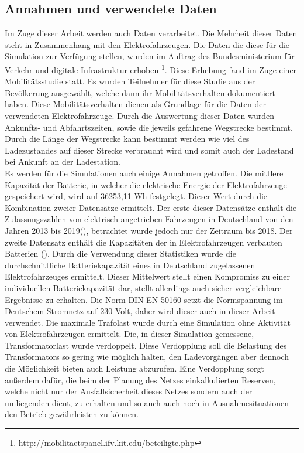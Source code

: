 \subsection{Annahmen und verwendete Daten}
Im Zuge dieser Arbeit werden auch Daten verarbeitet. Die Mehrheit dieser Daten steht in Zusammenhang mit den Elektrofahrzeugen. Die Daten die diese für die Simulation zur Verfügung stellen, wurden im Auftrag des Bundesministerium für Verkehr und digitale Infrastruktur erhoben \footnote{http://mobilitaetspanel.ifv.kit.edu/beteiligte.php}. Diese Erhebung fand im Zuge einer Mobilitätsstudie statt. Es wurden Teilnehmer für diese Studie aus der Bevölkerung ausgewählt, welche dann ihr Mobilitätsverhalten dokumentiert haben. Diese Mobilitätsverhalten dienen als Grundlage für die Daten der verwendeten Elektrofahrzeuge. Durch die Auswertung dieser Daten wurden Ankunfts- und Abfahrtszeiten, sowie die jeweils gefahrene Wegstrecke bestimmt. Durch die Länge der Wegstrecke kann bestimmt werden wie viel des Ladezustandes auf dieser Strecke verbraucht wird und somit auch der Ladestand bei Ankunft an der Ladestation.\\
Es werden für die Simulationen auch einige Annahmen getroffen. Die mittlere Kapazität der Batterie, in welcher die elektrische Energie der Elektrofahrzeuge gespeichert wird, wird auf 36253,11 Wh festgelegt. Dieser Wert durch die Kombination zweier Datensätze ermittelt. Der erste dieser Datensätze enthält die Zulassungszahlen von elektrisch angetrieben Fahrzeugen in Deutschland von den Jahren 2013 bis 2019(\cite{ahlswede_2020}), betrachtet wurde jedoch nur der Zeitraum bis 2018. Der zweite Datensatz enthält die Kapazitäten der in Elektrofahrzeugen verbauten Batterien (\cite{akkuStat}). Durch die Verwendung dieser Statistiken wurde die durchschnittliche Batteriekapazität eines in Deutschland zugelassenen Elektrofahrzeuges ermittelt. Dieser Mittelwert stellt einen Kompromiss zu einer individuellen Batteriekapazität dar, stellt allerdings auch sicher vergleichbare Ergebnisse zu erhalten. Die Norm DIN EN 50160 setzt die Normspannung im Deutschem Stromnetz auf 230 Volt, daher wird dieser auch in dieser Arbeit verwendet. Die maximale Trafolast wurde durch eine Simulation ohne Aktivität von Elektrofahrzeugen ermittelt. Die, in dieser Simulation gemessene, Transformatorlast wurde verdoppelt. Diese Verdopplung soll die Belastung des Transformators so gering wie möglich halten, den Ladevorgängen aber dennoch die Möglichkeit bieten auch Leistung abzurufen. Eine Verdopplung sorgt außerdem dafür, die beim der Planung des Netzes einkalkulierten Reserven, welche nicht nur der Ausfallsicherheit dieses Netzes sondern auch der umliegenden dient, zu erhalten und so auch auch noch in Ausnahmesituationen den Betrieb gewährleisten zu können.\\
